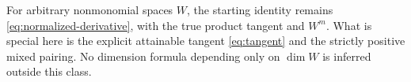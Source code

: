 For arbitrary nonmonomial spaces $W$, the starting identity remains
\eqref{eq:normalized-derivative}, with the true product tangent and
$W^m$. What is special here is the explicit attainable tangent
\eqref{eq:tangent} and the strictly positive mixed pairing. No dimension
formula depending only on $\dim W$ is inferred outside this class.
